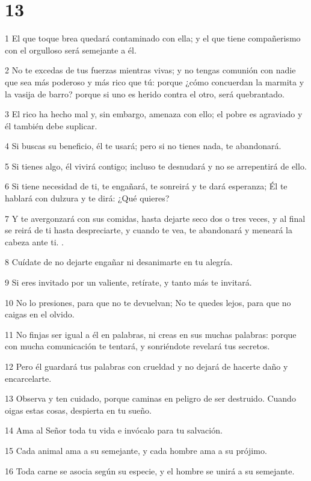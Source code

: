 \chapter{13}

\par 1 El que toque brea quedará contaminado con ella; y el que tiene compañerismo con el orgulloso será semejante a él.
\par 2 No te excedas de tus fuerzas mientras vivas; y no tengas comunión con nadie que sea más poderoso y más rico que tú: porque ¿cómo concuerdan la marmita y la vasija de barro? porque si uno es herido contra el otro, será quebrantado.
\par 3 El rico ha hecho mal y, sin embargo, amenaza con ello; el pobre es agraviado y él también debe suplicar.
\par 4 Si buscas su beneficio, él te usará; pero si no tienes nada, te abandonará.
\par 5 Si tienes algo, él vivirá contigo; incluso te desnudará y no se arrepentirá de ello.
\par 6 Si tiene necesidad de ti, te engañará, te sonreirá y te dará esperanza; Él te hablará con dulzura y te dirá: ¿Qué quieres?
\par 7 Y te avergonzará con sus comidas, hasta dejarte seco dos o tres veces, y al final se reirá de ti hasta despreciarte, y cuando te vea, te abandonará y meneará la cabeza ante ti. .
\par 8 Cuídate de no dejarte engañar ni desanimarte en tu alegría.
\par 9 Si eres invitado por un valiente, retírate, y tanto más te invitará.
\par 10 No lo presiones, para que no te devuelvan; No te quedes lejos, para que no caigas en el olvido.
\par 11 No finjas ser igual a él en palabras, ni creas en sus muchas palabras: porque con mucha comunicación te tentará, y sonriéndote revelará tus secretos.
\par 12 Pero él guardará tus palabras con crueldad y no dejará de hacerte daño y encarcelarte.
\par 13 Observa y ten cuidado, porque caminas en peligro de ser destruido. Cuando oigas estas cosas, despierta en tu sueño.
\par 14 Ama al Señor toda tu vida e invócalo para tu salvación.
\par 15 Cada animal ama a su semejante, y cada hombre ama a su prójimo.
\par 16 Toda carne se asocia según su especie, y el hombre se unirá a su semejante.
